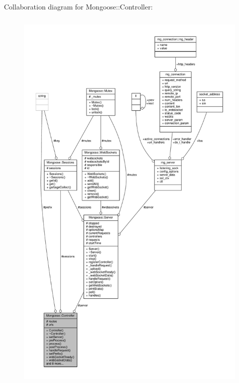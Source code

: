 Collaboration diagram for Mongoose\+:\+:Controller\+:
\nopagebreak
\begin{figure}[H]
\begin{center}
\leavevmode
\includegraphics[height=550pt]{d8/d10/classMongoose_1_1Controller__coll__graph}
\end{center}
\end{figure}
